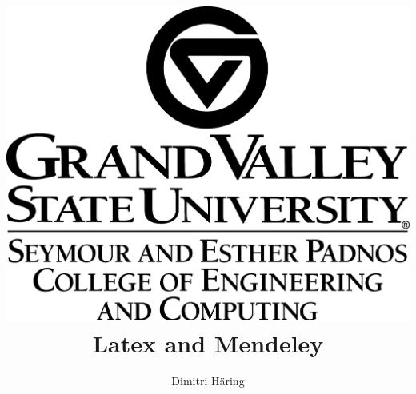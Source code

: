 \documentclass[11pt]{article} %
\title{	\includegraphics[scale=0.2]{02_images/gvsu_logo_marktop_SEPCEC_K_R.png}
		\linebreak 	\linebreak \linebreak
		Latex and Mendeley}
\author{Dimitri Häring}
\begin{document}
\maketitle

\clearpage %

\tableofcontents
\pagebreak


\printbibliography
\end{document}
